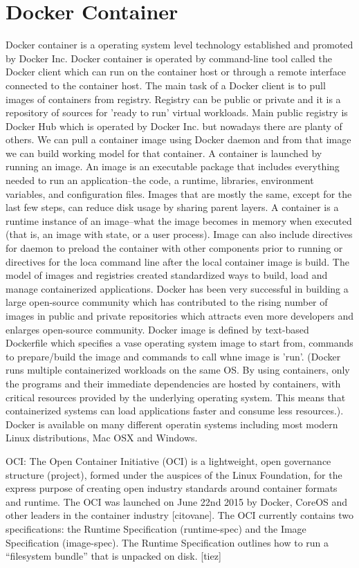 \section{Docker Container}
Docker container is a operating system level technology established  and promoted by Docker Inc. Docker container is operated by command-line tool called the Docker client which can run on the container host or through a remote interface connected to the container host. The main task of a Docker client is to pull images of containers from registry. Registry can be public or private and it is a repository of sources for 'ready to run' virtual workloads. Main public registry is Docker Hub which is operated by Docker Inc. but nowadays there are planty of others. We can pull a container image using Docker daemon and from that image we can build working model for that container. A container is launched by running an image. An image is an executable package that includes everything needed to run an application–the code, a runtime, libraries, environment variables, and configuration files. Images that are mostly the same, except for the last few steps, can reduce disk usage by sharing parent layers. A container is a runtime instance of an image–what the image becomes in memory when executed (that is, an image with state, or a user process). Image can also include directives for daemon to preload the container with other components prior to running or directives for the loca command line after the local container image is build. The model of images and registries created standardized ways to build, load and manage containerized applications. Docker has been very successful in building a large open-source community which has contributed to the rising number of images in public and private repositories which attracts even more developers and enlarges open-source community. Docker image is defined by text-based Dockerfile which specifies a vase operating system image to start from, commands to prepare/build the image and commands to call whne image is 'run'. (Docker runs multiple containerized workloads on the same OS. By using containers, only the programs and their immediate dependencies are hosted by containers, with critical resources provided by the underlying operating system.  This means that containerized systems can load applications faster and consume less resources.). Docker is available on many different operatin systems including most modern Linux distributions, Mac OSX and Windows.

OCI: The Open Container Initiative (OCI) is a lightweight, open governance structure (project), formed under the auspices of the Linux Foundation, for the express purpose of creating open industry standards around container formats and runtime. The OCI was launched on June 22nd 2015 by Docker, CoreOS and other leaders in the container industry [citovane]. The OCI currently contains two specifications: the Runtime Specification (runtime-spec) and the Image Specification (image-spec). The Runtime Specification outlines how to run a “filesystem bundle” that is unpacked on disk. [tiez]


